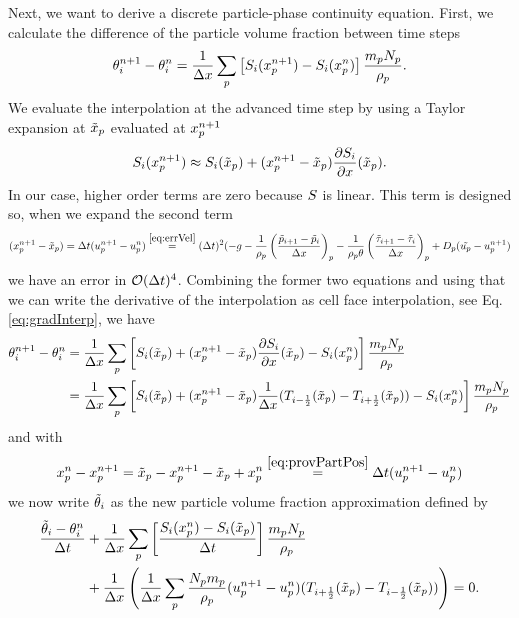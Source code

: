 Next, we want to derive a discrete particle-phase continuity equation. 
First, we calculate the difference of the particle volume fraction between time steps
\begin{align}
    \theta_i^{n+1} - \theta_i^n = \dfrac{1}{\Delta x} \sum_p \left[ S_i (x_p^{n+1}) - S_{i} (x_p^n) \right] \dfrac{m_p N_p}{\rho_p}.
\end{align}
We evaluate the interpolation at the advanced time step by using a Taylor expansion at $\tilde{x}_p$ evaluated at $x_p^{n+1}$
\begin{equation}
    S_i(x_p^{n+1}) \approx S_i (\tilde{x}_p) + (x_p^{n+1} - \tilde{x}_p) \dfrac{\partial S_i}{\partial x} (\tilde{x}_p).
\end{equation}
In our case, higher order terms are zero because $S$ is linear.
This term is designed so, when we expand the second term
\begin{equation}
    (x_p^{n+1} - \tilde{x}_p ) = \Delta t (u_p^{n+1} - u_p^n) \stackrel{\eqref{eq:errVel}}{=} (\Delta t )^2 ( -g - \dfrac{1}{\rho_p} \left( \dfrac{\tilde{p}_{i+1} - \tilde{p}_i}{\Delta x} \right)_p - \dfrac{1}{\rho_p \theta} \left( \dfrac{\tilde{\tau}_{i+1} - \tilde{\tau}_i}{\Delta x} \right)_p + D_p ( \tilde{u_p} - u_p^{n+1})
\end{equation}
we have an error in $\mathcal{O}(\Delta t )^4$.
Combining the former two equations and using that we can write the derivative of the interpolation as cell face interpolation, see Eq. \eqref{eq:gradInterp}, we have
\begin{equation}
    \begin{aligned}
    \theta_i^{n+1} - \theta_i^n &= \dfrac{1}{\Delta x} \sum_p \left[ S_i (\tilde{x}_p) + (x_p^{n+1} - \tilde{x}_p ) \dfrac{\partial S_i}{\partial x} (\tilde{x}_p) - S_i (x_p^n) \right] \dfrac{m_p N_p}{\rho_p}  \\
    &= \dfrac{1}{\Delta x} \sum_p \left[ S_i (\tilde{x}_p) + (x_p^{n+1} - \tilde{x}_p ) 
    \dfrac{1}{\Delta x} (T_{i-\frac{1}{2}} (\tilde{x}_p) - T_{i+\frac{1}{2}} (\tilde{x}_p))
    - S_i (x_p^n) \right] \dfrac{m_p N_p}{\rho_p}
    \end{aligned}
\end{equation}
and with
\begin{equation}
    x_p^{n} - x_p^{n+1} = \tilde{x}_p - x_p^{n+1} - \tilde{x}_p + x_p^n \stackrel{\eqref{eq:provPartPos}}{=} \Delta t (u_p^{n+1} - u_p^{n}) 
\end{equation}
we now write $\tilde{\theta}_i$ as the new particle volume fraction approximation defined by
\begin{equation}
\begin{aligned}
    \label{eq:fluidContDiscFull}
    \dfrac{\tilde{\theta}_i - \theta_i^n}{\Delta t} &+ \dfrac{1}{\Delta x} \sum_p \left[ \dfrac{S_i (x_p^n) - S_i (\tilde{x}_p)}{\Delta t} \right] \dfrac{m_p N_p}{\rho_p} \\ 
    &+ \dfrac{1}{\Delta x} \left( \dfrac{1}{\Delta x} \sum_p \dfrac{N_p m_p}{\rho_p} (u_p^{n+1} - u_p^{n}) (T_{i+\frac{1}{2}} (\tilde{x}_p) - T_{i-\frac{1}{2}}(\tilde{x}_p) )
    \right) = 0.
\end{aligned}
\end{equation}
